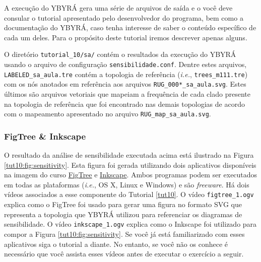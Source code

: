 \begin{refsection}
A execução do YBYRÁ gera uma série de arquivos de saída e o você deve consular o tutorial apresentado pelo desenvolvedor do programa, bem como a documentação do YBYRÁ, caso tenha interesse de saber o conteúdo específico de cada um deles. Para o propósito deste tutorial iremos descrever apenas alguns.

O diretório \texttt{tutorial\_10/sa/} contém o resultados da execução do YBYRÁ usando o arquivo de configuração \texttt{sensibilidade.conf}. Dentre estes arquivos, \texttt{LABELED\_sa\_aula.tre} contém a topologia de referência (\textit{i.e.}, \texttt{trees\_m111.tre}) com os nós anotados em referência aos arquivos \texttt{RUG\_000*\_sa\_aula.svg}. Estes últimos são arquivos vetoriais que mapeiam a frequência de cada clado presente na topologia de referência que foi encontrado nas demais topologias de acordo com o mapeamento apresentado no arquivo \texttt{RUG\_map\_sa\_aula.svg}. 

\subsubsection{FigTree \& Inkscape}\label{tut10:sa:evaluation:graphic}

O resultado da análise de sensibilidade executada acima está ilustrado na Figura \ref{tut10:fig:sensitivity}. Esta figura foi gerada utilizando dois aplicativos disponíveis na imagem do curso \href{http://tree.bio.ed.ac.uk/software/figtree/}{FigTree} e \href{http://www.inkscape.org/en/download/}{Inkscape}. Ambos programas podem ser executados em todas as plataformas (\textit{i.e.}, OS X, Linux e Windows) e são \textit{freeware}. Há dois vídeos associados a esse componente do Tutorial \ref{tut10}. O vídeo \texttt{figtree\_1.ogv} explica como o FigTree foi usado para gerar uma figura no formato SVG que representa a topologia que YBYRÁ utilizou para referenciar os diagramas de sensibilidade.  O vídeo \texttt{inkscape\_1.ogv} explica como o Inkscape foi utilizado para compor a Figura \ref{tut10:fig:sensitivity}. Se você já está familiarizado com esses aplicativos siga o tutorial a diante. No entanto, se você não os conhece é necessário que você assista esses vídeos antes de executar o exercício a seguir.


\end{refsection}

